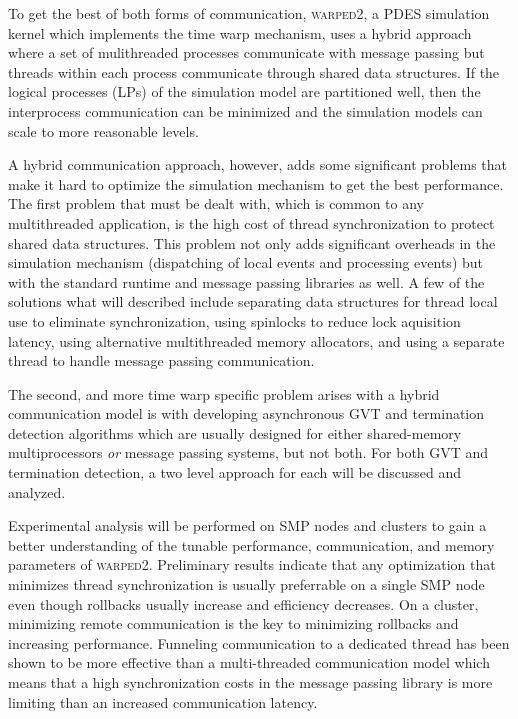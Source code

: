 \documentclass[11pt]{book}
\begin{document}
To get the best of both forms of communication, \textsc{warped2}, a PDES simulation kernel
which implements the time warp mechanism, uses a hybrid approach where a set of mulithreaded
processes communicate with message passing but threads within each process communicate through
shared data structures. If the logical processes (LPs) of the simulation model are partitioned
well, then the interprocess communication can be minimized and the simulation models can scale
to more reasonable levels.

A hybrid communication approach, however, adds some significant problems that make it hard
to optimize the simulation mechanism to get the best performance. The first problem that
must be dealt with, which is common to any multithreaded application, is the high cost of thread
synchronization to protect shared data structures. This problem not only adds significant overheads
in the simulation mechanism (dispatching of local events and processing events) but with the
standard runtime and message passing libraries as well. A few of the solutions what will described
include separating data structures for thread local use to eliminate synchronization, using
spinlocks to reduce lock aquisition latency, using alternative multithreaded memory allocators,
and using a separate thread to handle message passing communication.

The second, and more time warp specific problem arises with a hybrid communication model is with
developing asynchronous GVT and termination detection algorithms which are usually designed for
either shared-memory multiprocessors \emph{or} message passing systems, but not both. For both
GVT and termination detection, a two level approach for each will be discussed and analyzed.

Experimental analysis will be performed on SMP nodes and clusters to gain a better understanding
of the tunable performance, communication, and memory parameters of \textsc{warped2}. Preliminary
results indicate that any optimization that minimizes thread synchronization is usually preferrable
on a single SMP node even though rollbacks usually increase and efficiency decreases.
On a cluster, minimizing remote communication is the key to minimizing rollbacks and increasing
performance. Funneling communication to a dedicated thread has been shown to be more effective
than a multi-threaded communication model which means that a high synchronization costs in the
message passing library is more limiting than an increased communication latency.
\end{document}
